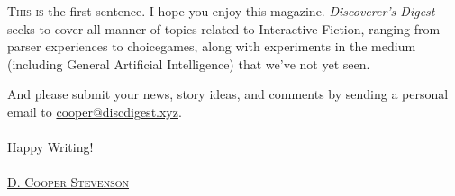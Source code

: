 \lettrine[lines=3]{\color{BrickRed}T}{\enspace his is} the first sentence.\reversemarginpar{}
I hope you enjoy this magazine. \emph{Discoverer's Digest } seeks to cover all manner of
topics related to Interactive Fiction, ranging from parser experiences to
choice\textemdash games, along with experiments in the medium (including General Artificial Intelligence) that we've not yet seen.

And please submit your news, story ideas, and comments by sending a personal email to \href{mailto:cooper@discdigest.xyz}{cooper@discdigest.xyz}. \\ \\

\noindent Happy Writing! \\ \\

\noindent \href{mailto:cooper@discdigest.xyz}{\textsc{D. Cooper Stevenson}}
